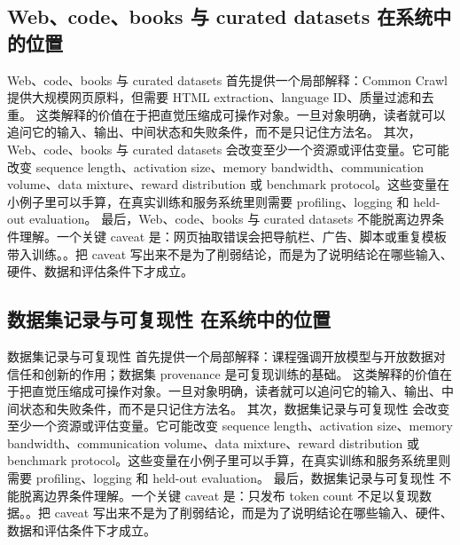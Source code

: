 \documentclass[a4paper]{article}
\begin{document}
\subsection{Web、code、books 与 curated datasets 在系统中的位置}
Web、code、books 与 curated datasets 首先提供一个局部解释：Common Crawl 提供大规模网页原料，但需要 HTML extraction、language ID、质量过滤和去重。 这类解释的价值在于把直觉压缩成可操作对象。一旦对象明确，读者就可以追问它的输入、输出、中间状态和失败条件，而不是只记住方法名。
其次，Web、code、books 与 curated datasets 会改变至少一个资源或评估变量。它可能改变 sequence length、activation size、memory bandwidth、communication volume、data mixture、reward distribution 或 benchmark protocol。这些变量在小例子里可以手算，在真实训练和服务系统里则需要 profiling、logging 和 held-out evaluation。
最后，Web、code、books 与 curated datasets 不能脱离边界条件理解。一个关键 caveat 是：网页抽取错误会把导航栏、广告、脚本或重复模板带入训练。。把 caveat 写出来不是为了削弱结论，而是为了说明结论在哪些输入、硬件、数据和评估条件下才成立。
\subsection{数据集记录与可复现性 在系统中的位置}
数据集记录与可复现性 首先提供一个局部解释：课程强调开放模型与开放数据对信任和创新的作用；数据集 provenance 是可复现训练的基础。 这类解释的价值在于把直觉压缩成可操作对象。一旦对象明确，读者就可以追问它的输入、输出、中间状态和失败条件，而不是只记住方法名。
其次，数据集记录与可复现性 会改变至少一个资源或评估变量。它可能改变 sequence length、activation size、memory bandwidth、communication volume、data mixture、reward distribution 或 benchmark protocol。这些变量在小例子里可以手算，在真实训练和服务系统里则需要 profiling、logging 和 held-out evaluation。
最后，数据集记录与可复现性 不能脱离边界条件理解。一个关键 caveat 是：只发布 token count 不足以复现数据。。把 caveat 写出来不是为了削弱结论，而是为了说明结论在哪些输入、硬件、数据和评估条件下才成立。
\end{document}
